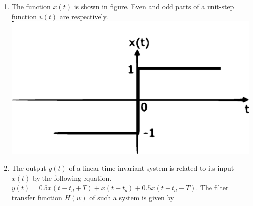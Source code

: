 \documentclass[journal,12pt,twocolumn]{IEEEtran}
\begin{document}
\begin{enumerate}[1.]
\begin{enumerate}[(A)]
\end{enumerate}






\item The function $x(t)$ is shown in figure. Even and odd parts of  a unit-step function $u(t)$ are respectively.\\

\includegraphics[scale=0.3]{fig4.eps}
\begin{enumerate}[(A)]
\end{enumerate} 



\item The output $y(t)$ of a linear time invariant system is related to its input $x(t)$ by the following equation. $y(t)=0.5x(t-t_d+T)+x(t-t_d)+0.5x(t-t_d-T)$. The filter transfer function $H(w)$ of such a system is given by

\begin{enumerate}[(A)]

\setlength\itemsep{1em}


\end{enumerate}
\end{enumerate}
\end{document}

